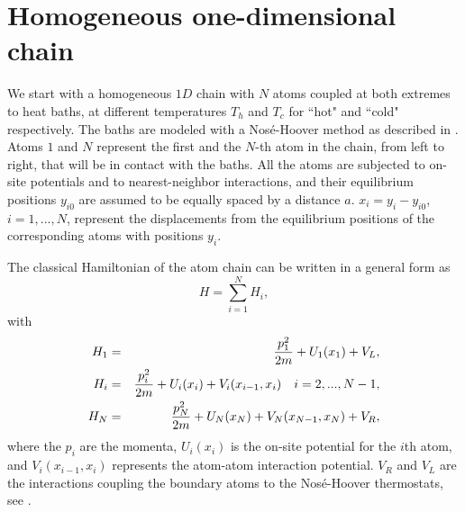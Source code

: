 \section{Homogeneous one-dimensional chain\label{sec:homogeneous_chain}}

We start with a homogeneous $1D$ chain with $N$ atoms coupled at both extremes to heat baths, at different temperatures $T_h$ and $T_c$ for ``hot" and ``cold" respectively. The baths are modeled with a Nos\' e-Hoover method as described in \cite{Martyna1992}. Atoms $1$ and $N$ represent the first and the $N$-th atom in the chain, from left to right, that will be in contact with the baths. All the atoms are subjected to on-site potentials and to nearest-neighbor interactions, and their equilibrium positions $y_{i0}$ are assumed to be equally spaced by a distance $a$.
$x_i= y_i-y_{i0}$,
$i=1,...,N$, represent the displacements from the equilibrium positions of the corresponding atoms
with positions $y_i$.

The classical Hamiltonian of the atom chain can be written in a general form as
%
\begin{equation}
\label{GH}
H=\sum_{i=1}^{N} H_i,
\end{equation}
%
with
%
\begin{eqnarray}
\label{GH2}
H_1&=&{{p^2_1} \over {2m}} +U_1(x_1)+V_L,
\nonumber\\
H_i&=&{{p^2_i} \over {2m}} +U_i(x_i)+V_i(x_{i-1},x_i)  \quad i=2,...,N-1,
 \nonumber\\
H_N&=&{{p^2_N} \over {2m}} +U_N(x_N)+V_N(x_{N-1},x_N) + V_R,
\end{eqnarray}
%
where the $p_i$ are the momenta, $U_i(x_i)$ is the on-site potential for the $i$th atom, and $V_i(x_{i-1},x_i)$ represents the atom-atom interaction potential. $V_R$ and $V_L$ are the interactions coupling the boundary atoms to the Nos\'e-Hoover thermostats, see \cite{Martyna1992}.

